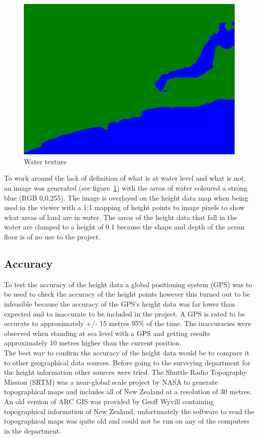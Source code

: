 \documentclass[12pt]{report}
\begin{document}
\begin{figure}[h]
\includegraphics[scale=0.25]{terrain.png}
\caption{Water texture}
\label{image:overlaytexture}
\end{figure}
To work around the lack of definition of what is at water level and what is not, an image was generated (see figure~\ref{image:overlaytexture}) with the areas of water coloured a strong blue (RGB 0,0,255). The image is overlayed on the height data map when being used in the viewer with a 1:1 mapping of height points to image pixels to show what areas of land are in water. The areas of the height data that fall in the water are clamped to a height of 0.1 because the shape and depth of the ocean floor is of no use to the project.\\

\subsection{Accuracy}
To test the accuracy of the height data a global positioning system (GPS) was to be used to check the accuracy of the height points however this turned out to be infeasible because the accuracy of the GPS's height data was far lower than expected and to inaccurate to be included in the project. A GPS is rated to be accurate to approximately +/- 15 metres 95\% of the time\cite{gpsaltitude}. The inaccuracies were observed when standing at sea level with a GPS and getting results approximately 10 metres higher than the current position.\\

The best way to confirm the accuracy of the height data would be to compare it to other geographical data sources. Before going to the surveying department for the height information other sources were tried. The Shuttle Radio Topography Mission (SRTM)\cite{srtm} was a near-global scale project by NASA to generate topographical maps and includes all of New Zealand at a resolution of 30 metres. An old version of ARC GIS was provided by Geoff Wyvill containing topographical information of New Zealand, unfortunately the software to read the topographical maps was quite old and could not be run on any of the computers in the department.\\
\end{document}
